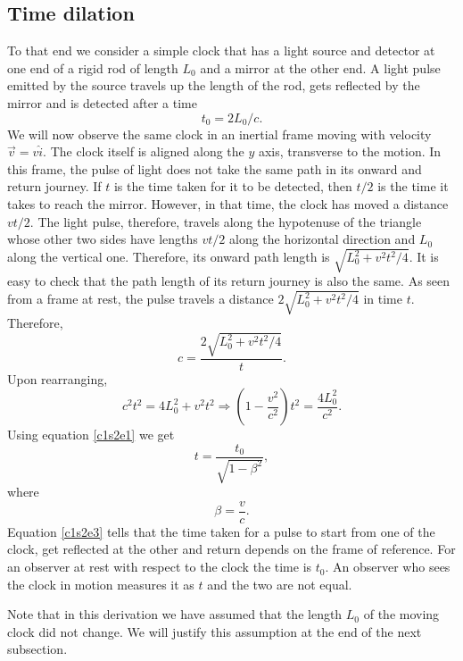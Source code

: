 \subsection{Time dilation}
To that end we consider a simple clock that has a light source and detector
at one end of a rigid rod of length $L_0$ and a mirror at the other end. A light
pulse emitted by the source travels up the length of the rod, gets reflected
by the mirror and is detected after a time 
\begin{equation}\label{c1s2e1}
t_0 = 2L_0/c.
\end{equation}
We will now observe the same clock in an inertial frame moving with velocity 
$\vec{v} = v\hat{i}$.  The clock itself is aligned along the $y$ axis, 
transverse to the motion.  In this frame, the pulse of light does not take the 
same path in its onward and return journey. If $t$ is the time taken for it to 
be detected, then $t/2$ is the time it takes to reach the mirror. However, in 
that time, the clock has moved a distance $vt/2$. The light pulse, therefore, 
travels along the hypotenuse of the triangle whose other two sides have lengths 
$vt/2$ along the horizontal direction and $L_0$ along the vertical one. 
Therefore, its onward path length is $\sqrt{L_0^2 + v^2t^2/4}$. It is easy to 
check that the path length of its return journey is also the same. As seen 
from a frame at rest, the pulse travels a distance $2\sqrt{L_0^2 + v^2t^2/4}$ 
in time $t$. Therefore,
\begin{equation}\label{c1s2e2}
c = \frac{2\sqrt{L_0^2 + v^2t^2/4}}{t}.
\end{equation}
Upon rearranging,
\[
c^2t^2 = 4L_0^2 + v^2t^2 \Rightarrow \left(1 - \frac{v^2}{c^2}\right)t^2 = 
\frac{4L_0^2}{c^2}.
\]
Using equation \eqref{c1s2e1} we get
\begin{equation}\label{c1s2e3}
t = \frac{t_0}{\sqrt{1 - \beta^2}},
\end{equation}
where
\begin{equation}\label{c1s2e4}
\beta = \frac{v}{c}.
\end{equation}
Equation \eqref{c1s2e3} tells that the time taken for a pulse to start from
one of the clock, get reflected at the other and return depends on the frame 
of reference. For an observer at rest with respect to the clock the time is 
$t_0$. An observer who sees the clock in motion measures it as $t$ and the two
are not equal.

Note that in this derivation we have assumed that the length $L_0$ of the 
moving clock did not change. We will justify this assumption at the end of the
next subsection.

